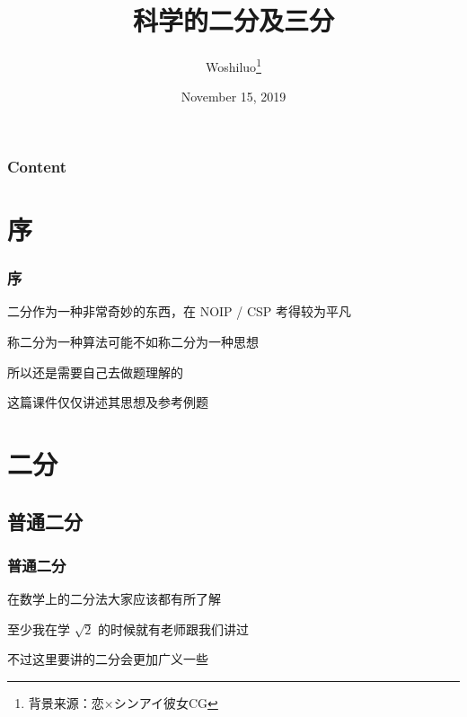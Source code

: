 \documentclass[10pt]{beamer}
\title{科学的二分及三分}
\author{Woshiluo\footnote{背景来源：恋×シンアイ彼女CG}}
\institute{My blog: \href{https://blog.woshiluo.com}{https://blog.woshiluo.com}}
\date{November 15, 2019}
\begin{document}
    \frame{\titlepage}
 
	\begin{frame}
		\frametitle{Content}
		\tableofcontents
    \end{frame}

	\section{序}

	\begin{frame}
		\frametitle{序}
		二分作为一种非常奇妙的东西，在 NOIP / CSP 考得较为平凡
		
		称二分为一种算法可能不如称二分为一种思想

		所以还是需要自己去做题理解的

		这篇课件仅仅讲述其思想及参考例题
	\end{frame}

	\section{二分}
	\subsection{普通二分}
	\begin{frame}
		\frametitle{普通二分}
		在数学上的二分法大家应该都有所了解

		至少我在学 $\sqrt{2}$ 的时候就有老师跟我们讲过

		不过这里要讲的二分会更加广义一些
	\end{frame}
\end{document}
